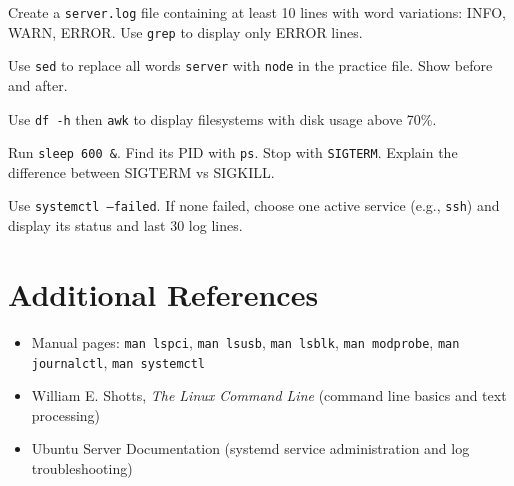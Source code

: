 \begin{exercisebox}[2.C]
Create a \texttt{server.log} file containing at least 10 lines with word variations: INFO, WARN, ERROR. Use \texttt{grep} to display only ERROR lines.
\end{exercisebox}

\begin{exercisebox}[2.D]
Use \texttt{sed} to replace all words \texttt{server} with \texttt{node} in the practice file. Show before and after.
\end{exercisebox}

\begin{exercisebox}[2.E]
Use \texttt{df -h} then \texttt{awk} to display filesystems with disk usage above 70\%.
\end{exercisebox}

\begin{exercisebox}[2.F]
Run \texttt{sleep 600 \&}. Find its PID with \texttt{ps}. Stop with \texttt{SIGTERM}. Explain the difference between SIGTERM vs SIGKILL.
\end{exercisebox}

\begin{exercisebox}[2.G]
Use \texttt{systemctl --failed}. If none failed, choose one active service (e.g., \texttt{ssh}) and display its status and last 30 log lines.
\end{exercisebox}

\section{Additional References}

\begin{itemize}
    \item Manual pages: \texttt{man lspci}, \texttt{man lsusb}, \texttt{man lsblk}, \texttt{man modprobe}, \texttt{man journalctl}, \texttt{man systemctl}
    \item William E. Shotts, \textit{The Linux Command Line} (command line basics and text processing)
    \item Ubuntu Server Documentation (systemd service administration and log troubleshooting)
\end{itemize}

